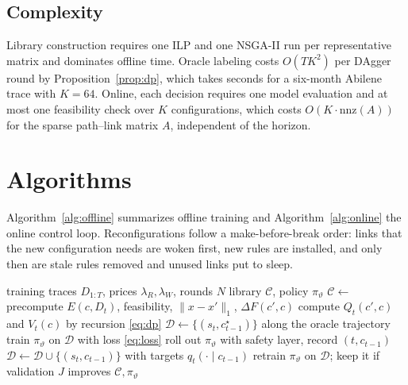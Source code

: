 \documentclass[journal]{IEEEtran}
\begin{document}
\subsection{Complexity}

Library construction requires one ILP and one NSGA-II run per representative matrix and dominates offline time. Oracle labeling costs $O(TK^2)$ per DAgger round by Proposition~\ref{prop:dp}, which takes seconds for a six-month Abilene trace with $K=64$. Online, each decision requires one model evaluation and at most one feasibility check over $K$ configurations, which costs $O(K\cdot\mathrm{nnz}(A))$ for the sparse path--link matrix $A$, independent of the horizon.

\section{Algorithms}\label{sec:algorithms}

Algorithm~\ref{alg:offline} summarizes offline training and Algorithm~\ref{alg:online} the online control loop. Reconfigurations follow a make-before-break order: links that the new configuration needs are woken first, new rules are installed, and only then are stale rules removed and unused links put to sleep.

\begin{algorithm}[t]
\caption{LiRA Offline Training}
\label{alg:offline}
\footnotesize
\begin{algorithmic}[1]
\Require training traces $D_{1:T}$, prices $\lambda_R,\lambda_W$, rounds $N$
\Ensure library $\mathcal{C}$, policy $\pi_\vartheta$
\State $\mathcal{C}\gets$  
\State precompute $E(c,D_t)$, feasibility, $\|x-x'\|_1$, $\Delta F(c',c)$
\State compute $Q_t(c',c)$ and $V_t(c)$ by recursion \eqref{eq:dp}
\State $\mathcal{D}\gets\{(s_t,c^\star_{t-1})\}$ along the oracle trajectory
\State train $\pi_\vartheta$ on $\mathcal{D}$ with loss \eqref{eq:loss}
\State roll out $\pi_\vartheta$ with safety layer, record $(t,c_{t-1})$
\State $\mathcal{D}\gets\mathcal{D}\cup\{(s_t,c_{t-1})\}$ with targets $q_t(\cdot\mid c_{t-1})$
\State retrain $\pi_\vartheta$ on $\mathcal{D}$; keep it if validation $J$ improves
\EndFor
\State \Return $\mathcal{C},\pi_\vartheta$
\end{algorithmic}
\end{algorithm}
\end{document}
